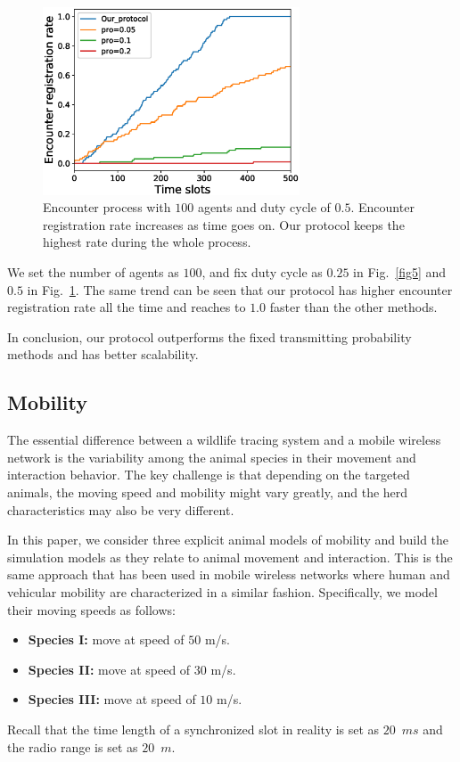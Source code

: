 \begin{figure}[h]
    \centering
    \includegraphics[width=3in]{figures/figure6.eps}
    \caption{Encounter process with $100$ agents and duty cycle of $0.5$. 
    Encounter registration rate increases as time goes on. Our protocol keeps
    the highest rate during the whole process.}
    \label{fig6}
\end{figure}

We set the number of agents as $100$, and fix
duty cycle as $0.25$ in Fig.~\ref{fig5} and $0.5$ in Fig.~\ref{fig6}.
The same trend can be seen that our protocol has higher encounter registration rate
all the time and reaches to $1.0$ faster than the other methods.

In conclusion, our protocol outperforms the fixed transmitting probability methods 
and has better scalability. 

\subsection{Mobility}

The essential difference between a wildlife tracing system
and a mobile wireless network is the variability among the animal
species in their movement and interaction behavior.
The key challenge is that depending on the targeted animals, 
the moving speed and mobility might vary greatly, and 
the herd characteristics may also be very different.

In this paper, we consider three explicit animal models of mobility
and build the simulation models as they relate to animal movement and interaction. 
This is the same approach that has been used in mobile wireless networks where 
human and vehicular mobility are characterized in a similar fashion.
Specifically, we model their moving speeds as follows:
\begin{itemize}
    \item \textbf{Species I:} move at speed of $50$ m/s. 
    \item \textbf{Species II:} move at speed of $30$ m/s. 
    \item \textbf{Species III:} move at speed of $10$ m/s. 
\end{itemize}
Recall that the time length of a synchronized slot in reality 
is set as $20$~$ms$ and the radio range is set as $20$~$m$.

